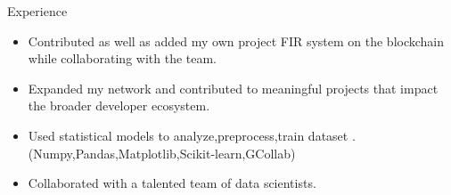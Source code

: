 \documentclass{resume} %
\begin{document}
\begin{workSection}{Experience}
    \experienceItem[
        company=Social Summer of Code (SSOC 23),
        location=Hack2skill,
        position=Contributor,
        duration=June 2023 – Aug 2023
    ]
     \begin{itemize}
        \itemsep -6pt {} 
        \item Contributed as well as added my own  project  FIR system on the blockchain while collaborating  with the team.
        \item Expanded my network and contributed to meaningful projects that impact the broader developer ecosystem.
     \end{itemize}
     
    \experienceItem[
        company=Codesoft,
        location=IT{,} Consulting,
        position=Data Science Intern,
        duration=June 2023 – July 2023
    ]
    \begin{itemize}
        \itemsep -6pt {} 
        \item Used statistical models  to analyze{,}preprocess{,}train dataset .(Numpy{,}Pandas{,}Matplotlib{,}Scikit{-}learn{,}GCollab)
        \item Collaborated with a talented team of data scientists.
     \end{itemize}
     
\end{workSection}
\end{document}
